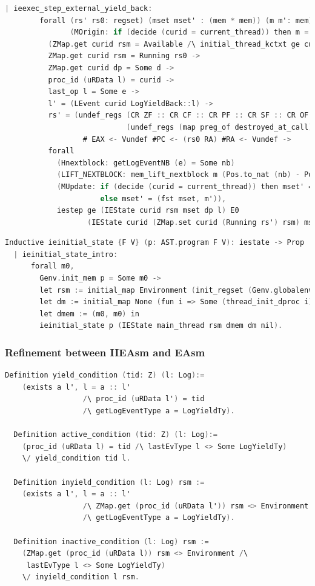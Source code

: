 \begin{lstlisting}[language=C]
    | ieexec_step_external_yield_back:
        forall (rs' rs0: regset) (mset mset' : (mem * mem)) (m m': mem) curid rsm l l' nb dp d e
               (MOrigin: if (decide (curid = current_thread)) then m = fst mset else m = snd mset),
          (ZMap.get curid rsm = Available /\ initial_thread_kctxt ge curid l = Some rs0) \/
          ZMap.get curid rsm = Running rs0 ->
          ZMap.get curid dp = Some d ->
          proc_id (uRData l) = curid ->
          last_op l = Some e ->
          l' = (LEvent curid LogYieldBack::l) ->
          rs' = (undef_regs (CR ZF :: CR CF :: CR PF :: CR SF :: CR OF :: nil)
                            (undef_regs (map preg_of destroyed_at_call) rs0)) 
                  # EAX <- Vundef #PC <- (rs0 RA) #RA <- Vundef ->
          forall
            (Hnextblock: getLogEventNB (e) = Some nb)
            (LIFT_NEXTBLOCK: mem_lift_nextblock m (Pos.to_nat (nb) - Pos.to_nat (Mem.nextblock m) % nat) = m')
            (MUpdate: if (decide (curid = current_thread)) then mset' = (m', snd mset) 
                      else mset' = (fst mset, m')),
            iestep ge (IEState curid rsm mset dp l) E0
                   (IEState curid (ZMap.set curid (Running rs') rsm) mset' dp l').

\end{lstlisting}

\begin{lstlisting}[language=C]
  Inductive ieinitial_state {F V} (p: AST.program F V): iestate -> Prop :=
  | ieinitial_state_intro: 
      forall m0,
        Genv.init_mem p = Some m0 ->
        let rsm := initial_map Environment (init_regset (Genv.globalenv p)) active_threads in
        let dm := initial_map None (fun i => Some (thread_init_dproc i)) active_threads in
        let dmem := (m0, m0) in
        ieinitial_state p (IEState main_thread rsm dmem dm nil).
\end{lstlisting}

\subsubsection{Refinement between IIEAsm and EAsm}
\begin{lstlisting}[language=C]
  Definition yield_condition (tid: Z) (l: Log):=
    (exists a l', l = a :: l'
                  /\ proc_id (uRData l') = tid
                  /\ getLogEventType a = LogYieldTy).

  Definition active_condition (tid: Z) (l: Log):=
    (proc_id (uRData l) = tid /\ lastEvType l <> Some LogYieldTy)
    \/ yield_condition tid l.

  Definition inyield_condition (l: Log) rsm :=
    (exists a l', l = a :: l' 
                  /\ ZMap.get (proc_id (uRData l')) rsm <> Environment
                  /\ getLogEventType a = LogYieldTy).

  Definition inactive_condition (l: Log) rsm :=
    (ZMap.get (proc_id (uRData l)) rsm <> Environment /\
     lastEvType l <> Some LogYieldTy)
    \/ inyield_condition l rsm.
\end{lstlisting}

